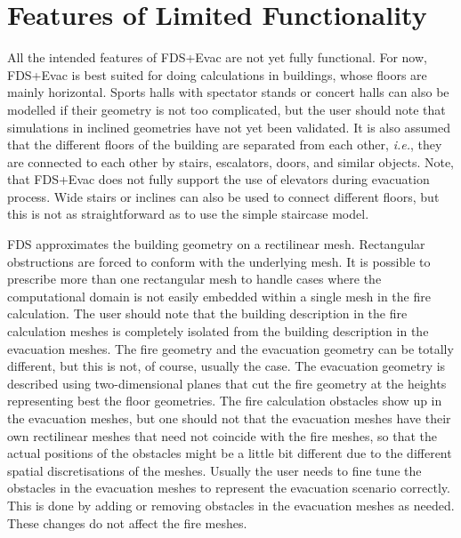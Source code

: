 \documentclass[12pt,a4paper,final,twoside]{stylevk}
\begin{document}
\section{Features of Limited Functionality}\label{Sec_SpecFeatures}


\noindent All the intended features of FDS+Evac are not yet fully
functional.  For now, FDS+Evac is best suited for doing calculations
in buildings, whose floors are mainly horizontal.  Sports halls with
spectator stands or concert halls can also be modelled if their
geometry is not too complicated, but the user should note that
simulations in inclined geometries have not yet been validated.  It is
also assumed that the different floors of the building are separated
from each other, \emph{i.e.}, they are connected to each other by
stairs, escalators, doors, and similar objects.  Note, that FDS+Evac
does not fully support the use of elevators during evacuation process.
Wide stairs or inclines can also be used to connect different floors,
but this is not as straightforward as to use the simple staircase
model.


FDS approximates the building geometry on a rectilinear mesh.
Rectangular obstructions are forced to conform with the underlying
mesh.  It is possible to prescribe more than one rectangular mesh to
handle cases where the computational domain is not easily embedded
within a single mesh in the fire calculation.  The user should note
that the building description in the fire calculation meshes is
completely isolated from the building description in the evacuation
meshes.  The fire geometry and the evacuation geometry can be totally
different, but this is not, of course, usually the case.  The
evacuation geometry is described using two-dimensional planes that cut
the fire geometry at the heights representing best the floor
geometries.  The fire calculation obstacles show up in the evacuation
meshes, but one should not that the evacuation meshes have their own
rectilinear meshes that need not coincide with the fire meshes, so
that the actual positions of the obstacles might be a little bit
different due to the different spatial discretisations of the meshes.
Usually the user needs to fine tune the obstacles in the evacuation
meshes to represent the evacuation scenario correctly.  This is done
by adding or removing obstacles in the evacuation meshes as needed.
These changes do not affect the fire meshes.
\end{document}
